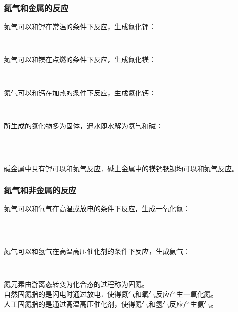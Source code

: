 \documentclass[UTF8]{ctexart}
\begin{document}
\subsubsection{氮气和金属的反应}
    氮气可以和锂在常温的条件下反应，生成氮化锂：
    \begin{center}
        \\[4mm]
    \end{center}
    氮气可以和镁在点燃的条件下反应，生成氮化镁：
    \begin{center}
        \\[4mm]
    \end{center}
    氮气可以和钙在加热的条件下反应，生成氮化钙：
    \begin{center}
        \\[4mm]
    \end{center}
    所生成的氮化物多为固体，遇水即水解为氨气和碱：
    \begin{center}
        \\[2mm]
        \\[4mm]
    \end{center}
    碱金属中只有锂可以和氮气反应，碱土金属中的镁钙锶钡均可以和氮气反应。

\subsubsection{氮气和非金属的反应}
    氮气可以和氧气在高温或放电的条件下反应，生成一氧化氮：\vspace{3pt}
    \begin{center}
        \\[3mm]
        \\[6mm]
    \end{center}
    氮气可以和氢气在高温高压催化剂的条件下反应，生成氨气：\vspace{3pt}
    \begin{center}
        \\[6mm]
    \end{center}
    氮元素由游离态转变为化合态的过程称为固氮。\\[3mm]
    自然固氮指的是闪电时通过放电，使得氮气和氧气反应产生一氧化氮。\\[3mm]
    人工固氮指的是通过高温高压催化剂，使得氮气和氢气反应产生氨气。
\end{document}
